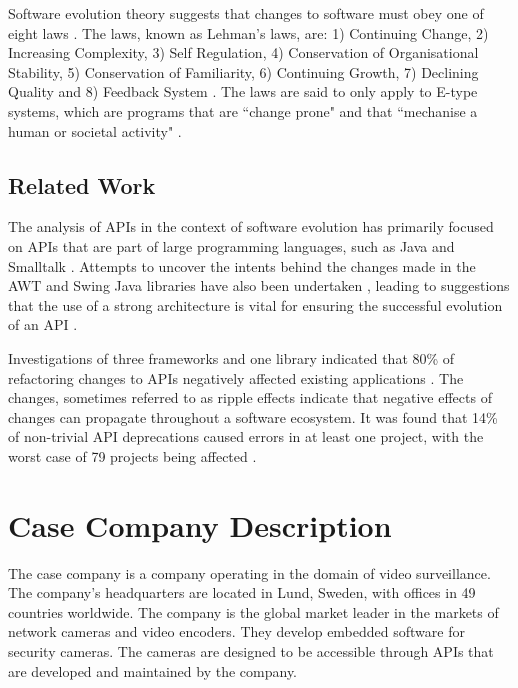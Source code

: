\documentclass{sig-alternate}
\begin{document}
Software evolution theory suggests that changes to software must obey one of eight laws \cite{lehman1980programs}. The laws, known as Lehman's laws, are: 1) Continuing Change, 2) Increasing Complexity, 3) Self Regulation, 4) Conservation of Organisational Stability, 5) Conservation of Familiarity, 6) Continuing Growth, 7) Declining Quality and 8) Feedback System \cite{lehman1980programs}. The laws are said to only apply to E-type systems, which are programs that are ``change prone" and that ``mechanise a human or societal activity" \cite{lehman1980programs}.     

\subsection{Related Work} \label{related_work}
The analysis of APIs in the context of software evolution has primarily focused on APIs that are part of large programming languages, such as Java \cite{hou2011exploring} \cite{shi2011empirical} and Smalltalk \cite{robbes2012developers}. Attempts to uncover the intents behind the changes made in the AWT and Swing Java libraries have also been undertaken \cite{hou2011exploring}, leading to suggestions that the use of a strong architecture is vital for ensuring the successful evolution of an API \cite{hou2011exploring}.

Investigations of three frameworks and one library indicated that 80\% of refactoring changes to APIs negatively affected existing applications \cite{dig2005role}. The changes, sometimes referred to as ripple effects \cite{robbes2012developers} indicate that negative effects of changes can propagate throughout a software ecosystem. It was found that 14\% of non-trivial API deprecations caused errors in at least one project, with the worst case of 79 projects being affected \cite{robbes2012developers}.




\section{Case Company Description} \label{case_company_description}
The case company is a company operating in the domain of video surveillance. The company's headquarters are located in Lund, Sweden, with offices in 49 countries worldwide. The company is the global market leader in the markets of network cameras and video encoders. They develop embedded software for security cameras. The cameras are designed to be accessible through APIs that are developed and maintained by the company. 
\end{document}
